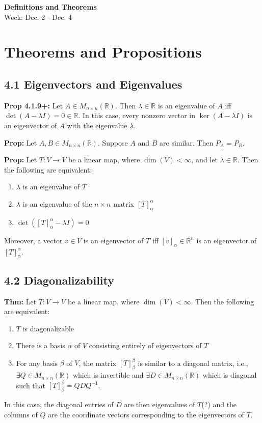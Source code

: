 \noindent
\textbf{\LARGE Definitions and Theorems} \\
\large Week: Dec. 2 - Dec. 4

\normalsize

\section*{Theorems and Propositions}
\subsection*{4.1 Eigenvectors and Eigenvalues}
\textbf{Prop 4.1.9+:} Let $A \in M_{n \times n}(\mathbb{R})$. Then $\lambda \in \mathbb{R}$ is an eigenvalue of $A$ iff $\det(A-\lambda I)=0 \in \mathbb{R}$. In this case, every nonzero vector in $\ker(A-\lambda I)$ is an eigenvector of $A$ with the eigenvalue $\lambda$.

\bigskip 

\noindent 
\textbf{Prop:} Let $A, B \in M_{n \times n}(\mathbb{R})$. Suppose $A$ and $B$ are similar. Then $P_A = P_B$.

\bigskip 

\noindent 
\textbf{Prop:} Let $T: V \rightarrow V$ be a linear map, where $\dim(V) < \infty$, and let $\lambda \in \mathbb{R}$. Then the following are equivalent:
\begin{enumerate}
    \item $\lambda$ is an eigenvalue of $T$ 
    \item $\lambda$ is an eigenvalue of the $n \times n$ matrix $[T]_\alpha^\alpha$
    \item $\det([T]_\alpha^\alpha-\lambda I)=0$ 
\end{enumerate}
Moreover, a vector $\bar v \in V$ is an eigenvector of $T$ iff $[\bar v]_\alpha \in \mathbb{R}^n$ is an eigenvector of $[T]_\alpha^\alpha$.

\subsection*{4.2 Diagonalizability}
\textbf{Thm:} Let $T: V \rightarrow V$ be a linear map, where $\dim(V) < \infty$. Then the following are equivalent:
\begin{enumerate}
    \item $T$ is diagonalizable 
    \item There is a basis $\alpha$ of $V$ consisting entirely of eigenvectors of $T$ 
    \item For any basis $\beta$ of $V$, the matrix $[T]_\beta^\beta$ is similar to a diagonal matrix, i.e., $\exists Q \in M_{n \times n}(\mathbb{R})$ which is invertible and $\exists D \in M_{n \times n}(\mathbb{R})$ which is diagonal such that $[T]_\beta^\beta=QDQ^{-1}$.
\end{enumerate}
In this case, the diagonal entries of $D$ are then eigenvalues of $T$(?) and the columns of $Q$ are the coordinate vectors corresponding to the eigenvectors of $T$.

